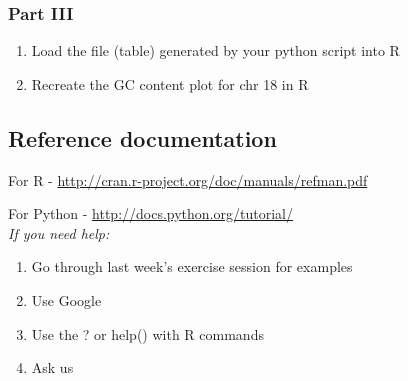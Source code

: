 \documentclass[a4paper,11pt]{article}
\begin{document}
\subsubsection{Part III}
\begin{enumerate}
\item Load the file (table) generated by your python script into R
\item Recreate the GC content plot for chr 18 in R
\end{enumerate}


\subsection{Reference documentation}
\normalsize For R - \url{http://cran.r-project.org/doc/manuals/refman.pdf}

For Python - \url{http://docs.python.org/tutorial/}\\

\emph{If you need help:}
\begin{enumerate}
\item Go through last week's exercise session for examples
\item Use Google
\item Use the ? or help() with R commands
\item Ask us
\end{enumerate}
\end{document}
